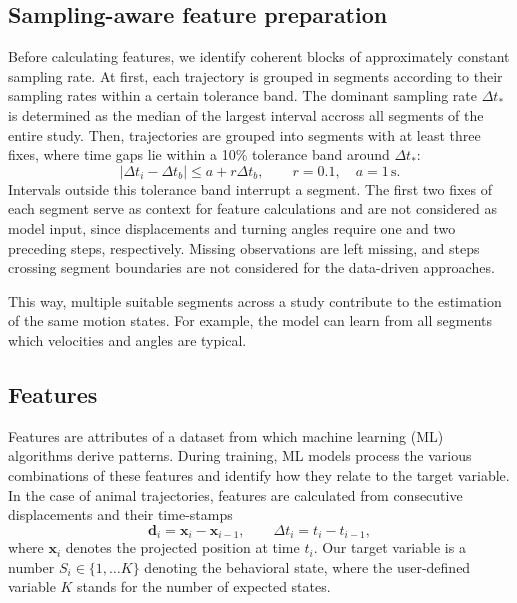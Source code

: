 \subsection{Sampling-aware feature preparation}
\label{subsec:seg-preprocessing}
Before calculating features, we identify coherent blocks of approximately constant sampling rate.
At first, each trajectory is grouped in segments according to their sampling rates within a certain tolerance band.
The dominant sampling rate $\Delta t_*$ is determined as the median of the largest interval accross all segments of the entire study.
Then, trajectories are grouped into segments with at least three fixes, where time gaps lie within a 10\% tolerance band around $\Delta t_*$:
\[
        |\Delta t_i-\Delta t_b|
        \leq a+r\Delta t_b,
        \qquad r=0.1,\quad a=1\,\mathrm{s}.
\]
Intervals outside this tolerance band interrupt a segment. 
The first two fixes of each segment serve as context for feature calculations and are not considered as model input, since displacements and turning angles require one and two preceding steps, 
respectively.
Missing observations are left missing, and steps crossing segment boundaries are not considered for the data-driven approaches. 

This way, multiple suitable segments across a study contribute to the estimation of the same motion states. 
For example, the model can learn from all segments which velocities and angles are typical.

\subsection{Features}
\label{subsec:features}
Features are attributes of a dataset from which machine learning (ML) algorithms derive patterns.
During training, ML models process the various combinations of these features and identify how they relate to the target variable.
In the case of animal trajectories, features are calculated from consecutive displacements and their time-stamps
    \[
        \mathbf{d}_i=\mathbf{x}_i-\mathbf{x}_{i-1},
        \qquad
        \Delta t_i=t_i-t_{i-1},
    \]
where $\mathbf{x}_i$ denotes the projected position at time $t_i$.
Our target variable is a number $S_i \in \{1, \ldots K\}$ denoting the behavioral state, where the user-defined variable $K$ stands for the number of expected states.



